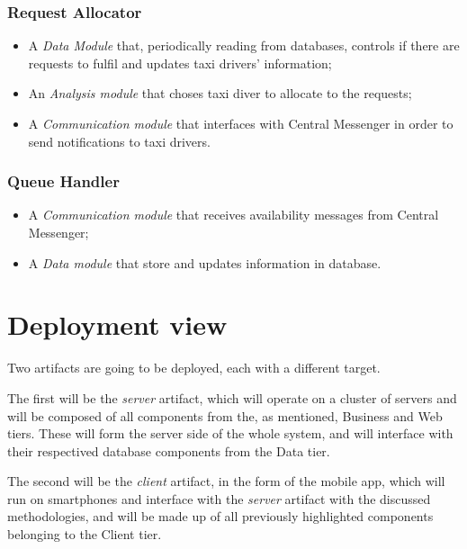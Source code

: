 \subsubsection{Request Allocator}
\begin{itemize}
\item A \emph{Data Module} that, periodically reading from databases, controls if there are requests to fulfil and updates taxi drivers’ information;
\item An \emph{Analysis module} that choses taxi diver to allocate to the requests;
\item A \emph{Communication module} that interfaces with Central Messenger in order to send notifications to taxi drivers.
\end{itemize}

\subsubsection{Queue Handler} 
\begin{itemize}
\item A \emph{Communication module} that receives availability messages from Central Messenger;
\item A \emph{Data module} that store and updates information in database.
\end{itemize}



\section{Deployment view}
Two artifacts are going to be deployed, each with a different target.

The first will be the \emph{server} artifact, which will operate on a cluster of servers and will be composed of all components from the, as mentioned, Business and Web tiers. These will form the server side of the whole system, and will interface with their respectived database components from the Data tier.

The second will be the \emph{client} artifact, in the form of the \mts{} mobile app, which will run on smartphones and interface with the \emph{server} artifact with the discussed methodologies, and will be made up of all previously highlighted components belonging to the Client tier.


